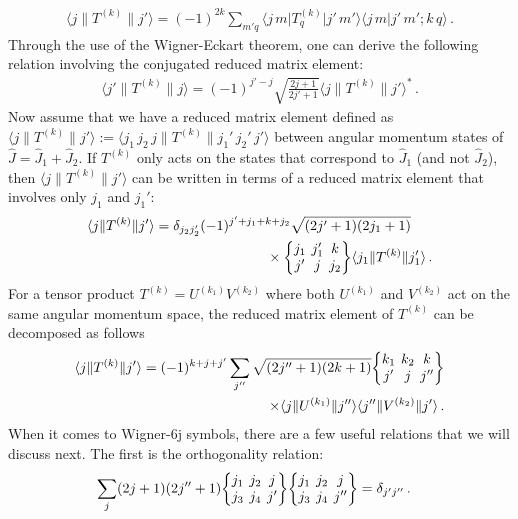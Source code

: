 \documentclass[../Thesis-IJspeert.tex]{subfiles}
\begin{document}
\begin{appendices}
\begin{align}
\label{inversewigner}
\langle j \| T^{(k)} \| j' \rangle = (-1)^{2k}\sum_{m'q} \langle j\, m \vert  T^{(k)}_q \vert j'\, m' \rangle \langle j\, m \vert j'\, m'; k\, q \rangle\,.
\end{align}
Through the use of the Wigner-Eckart theorem, one can derive the following relation involving the conjugated reduced matrix element:
\begin{align}
\label{ccreducedmatrixelement}
	\langle j' \| T^{(k)} \| j \rangle = (-1)^{j'-j}\sqrt{\frac{2j+1}{2j'+1}}\langle j \| T^{(k)} \| j' \rangle^*\,.
\end{align}
Now assume that we have a reduced matrix element defined as $\langle j \| T^{(k)} \| j' \rangle := \langle j_1\, j_2\, j \| T^{(k)} \| j_1'\,j_2'\,j' \rangle$ between angular momentum states of $\hat{J}=\hat{J}_1+\hat{J}_2$. If $T^{(k)}$ only acts on the states that correspond to $\hat{J}_1$ (and not $\hat{J}_2$), then $\langle j \| T^{(k)} \| j' \rangle$ can be written in terms of a reduced matrix element that involves only $j_1$ and $j_1'$:
\begin{align}
\label{reducedmatrixelementonecomponent}
\begin{split}
\langle j \| T^{(k)} \| j' \rangle &= \delta_{j_2 j_2'} (-1)^{j'+j_1+k+j_2}\sqrt{(2j'+1)(2j_1+1)}\\ &\hspace{8em}\times\tj{j_1}{j_1'}{k}{j'}{j}{j_2} \langle j_1 \| T^{(k)} \| j_1' \rangle \,.
\end{split}
\end{align}
For a tensor product $T^{(k)}=U^{(k_1)}V^{(k_2)}$ where both $U^{(k_1)}$ and $V^{(k_2)}$ act on the same angular momentum space, the reduced matrix element of $T^{(k)}$ can be decomposed as follows
\begin{align}
\label{splitreducedmatrixelement}
\begin{split}
	\langle j \| T^{(k)} \| j' \rangle = (-1)^{k+j+j'}\sum_{j''}\sqrt{(2j''+1)(2k+1)} \tj{k_1}{k_2}{k}{j'}{j}{j''} \\ \times \langle j \| U^{(k_1)} \| j'' \rangle \langle j'' \| V^{(k_2)} \| j' \rangle\,.
\end{split}
\end{align}
When it comes to Wigner-6j symbols, there are a few useful relations that we will discuss next. The first is the orthogonality relation:
\begin{align}
\label{orthogonality6j}
& \sum_j(2 j+1)\left(2 j''+1\right)\tj{j_1}{j_2}{j}{j_3}{j_4}{j'}\tj{j_1}{j_2}{j}{j_3}{j_4}{j''}=\delta_{j' j''}\,.

\end{align}
\end{appendices}
\end{document}
